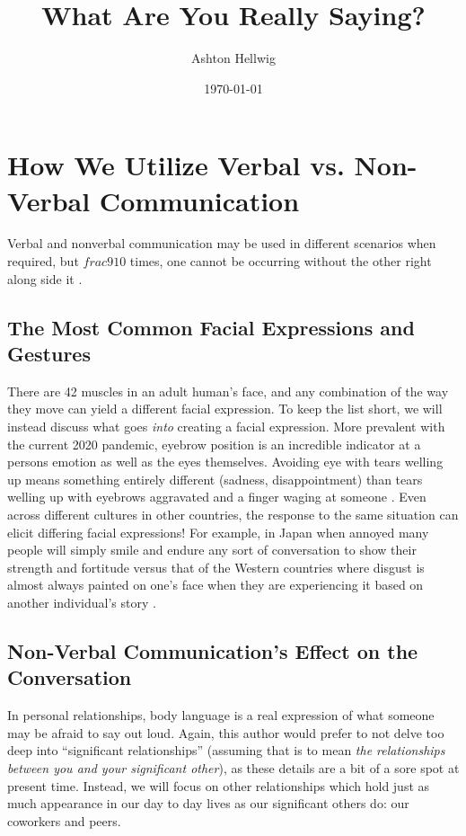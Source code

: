 \documentclass[stu,12pt]{apa7}
\title{%
    What Are You Really Saying?
  }
\author{Ashton Hellwig}
\date{\today}
\begin{document}
  \maketitle


  \section{How We Utilize Verbal vs. Non-Verbal Communication}
    Verbal and nonverbal communication may be used in different scenarios
      when required, but \(frac{9}{10}\) times, one cannot be occurring without
      the other right along side it
      \parencite[pp. 150]{noauthor_communication_2013}.

    \subsection{The Most Common Facial Expressions and Gestures}
      There are 42 muscles in an adult human's face, and any combination of
        the way they move can yield a different facial expression. To keep the
        list short, we will instead discuss what goes \textit{into} creating
        a facial expression. More prevalent with the current 2020 pandemic,
        eyebrow position is an incredible indicator at a persons emotion as well
        as the eyes themselves. Avoiding eye with tears welling up means
        something entirely different (sadness, disappointment) than tears
        welling up with eyebrows aggravated and a finger waging at someone
        \parencite[pp. 207]{cohn_observer-based_2007}. Even across different
        cultures in other countries, the response to the same situation can
        elicit differing facial expressions! For example, in Japan when annoyed
        many people will simply smile and endure any sort of conversation to
        show their strength and fortitude versus that of the Western countries
        where disgust is almost always painted on one's face when they are
        experiencing it based on another individual's story
        \parencite[pp. 2]{safdar_variations_2009}.

    \subsection{Non-Verbal Communication's Effect on the Conversation}
      In personal relationships, body language is a real expression of what
        someone may be afraid to say out loud. Again, this author would prefer
        to not delve too deep into ``significant relationships'' (assuming
        that is to mean \textit{the relationships between you and your
        significant other}), as these details are a bit of a sore spot at
        present time. Instead, we will focus on other relationships which hold
        just as much appearance in our day to day lives as our significant
        others do: our coworkers and peers.
\end{document}
